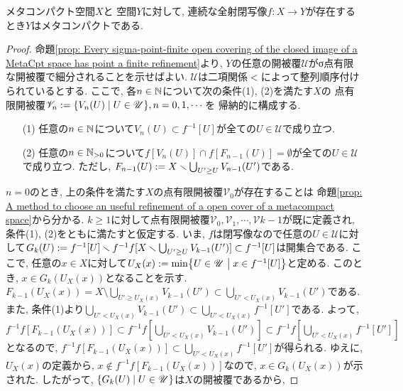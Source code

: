 \documentclass[uplatex, dvipdfmx, a4paper, 12pt, class=jsbook, crop=false]{standalone}
\begin{document}
\begin{theorem}[Worrell]
	\label{thm:Worrell's Theorem}
	メタコンパクト空間$ X $と \Hausdorff 空間$ Y $に対して, 
	連続な全射閉写像$ f \colon X \to Y $が存在するとき$ Y $はメタコンパクトである.
\end{theorem}

\begin{proof}
	命題\ref{prop: Every sigma-point-finite open covering of the closed image of a MetaCpt space 
	has point a finite refinement}より,
	$ Y $の任意の開被覆$ \mathscr{U} $がσ点有限な開被覆で細分されることを示せばよい.
	$ \mathscr{U} $は二項関係$ < $によって整列順序付けられているとする.
	ここで, 各$ n \in \mathbb{N} $について次の条件(1), (2)を満たす$ X $の
	点有限開被覆$ \mathscr{V}_n \defeq \setcomp{V_n(U)}{U \in \mathscr{U}}, n=0, 1, \cdots $を
	帰納的に構成する.
	\begin{enumerate}
		\item[(1)] 任意の$ n \in \mathbb{N} $について$ V_n(U) \subset f^{-1}[U] $が全ての$ U \in \mathscr{U} $で成り立つ.
		\item[(2)] 任意の$ n \in \mathbb{N}_{>0} $について$ f[V_n(U)] \cap f[F_{n-1}(U)] = \emptyset $が全ての$ U \in \mathscr{U} $で成り立つ. 
		ただし, $ F_{n-1}(U) \mathrel{:=} X \smallsetminus \bigcup_{U' \geq U} V_{n-1}(U') $である. 
	\end{enumerate}
	$ n = 0 $のとき, 上の条件を満たす$ X $の点有限開被覆$ \mathscr{V}_0 $が存在することは
		命題\ref{prop: A method to choose an useful refinement of a open cover of a metacompact space}から分かる.
	$ k \geq 1 $に対して点有限開被覆$ \mathscr{V}_0, \mathscr{V}_1, \cdots, \mathscr{V}{k-1} $が既に定義され, 
	条件(1), (2)をともに満たすと仮定する.
	いま, $ f $は閉写像なので任意の$ U \in \mathscr{U} $に対して$ G_k(U) \mathrel{:=} f^{-1}[U] 
	\smallsetminus f^{-1}f[X \smallsetminus \bigcup_{U' \geq U} V_{k-1}(U')] \subset f^{-1}[U] $は開集合である.
	ここで, 任意の$ x \in X $に対して$ U_X(x) \defeq \min \setcomp{U \in \mathscr{U}}{x \in f^{-1}[U]} $と定める.
	このとき, $ x \in G_k(U_X(x)) $となることを示す.
	$ F_{k-1}(U_X(x)) = X \setminus \bigcup_{U' \geq U_X(x)} V_{k-1}(U') \subset \bigcup_{U' < U_X(x)} V_{k-1}(U') $である.
	また, 条件(1)より$ \bigcup_{U' < U_X(x)} V_{k-1}(U') \subset \bigcup_{U' < U_X(x)} f^{-1}[U'] $である.
	よって, $ f^{-1}f[F_{k-1}(U_X(x))] \subset f^{-1}f[\bigcup_{U' < U_X(x)} V_{k-1}(U')] 
	\subset f^{-1}f[\bigcup_{U' < U_X(x)} f^{-1}[U']] $となるので,
	$ f^{-1}f[F_{k-1}(U_X(x))] \subset \bigcup_{U' < U_X(x)} f^{-1}[U'] $が得られる.
	ゆえに, $ U_X(x) $の定義から, $ x \notin f^{-1}f[F_{k-1}(U_X(x))] $なので,
	$ x \in G_k(U_X(x)) $が示された. したがって, $ \setcomp{G_{k}(U)}{U \in \mathscr{U}} $は$ X $の開被覆であるから,

\end{proof}
\end{document}
